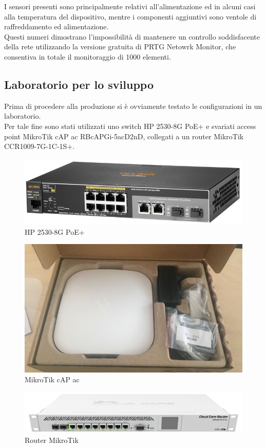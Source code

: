 \documentclass[Realizzazione.tex]{subfiles}
\begin{document}
I sensori presenti sono principalmente relativi all'alimentazione ed in alcuni casi alla temperatura del dispositivo, mentre i componenti aggiuntivi sono ventole di raffreddamento ed alimentazione. \\
Questi numeri dimostrano l'impossibilità di mantenere un controllo soddisfacente della rete utilizzando la versione gratuita di PRTG Netowrk Monitor, che consentiva in totale il monitoraggio di 1000 elementi. \\

\subsection{Laboratorio per lo sviluppo}
Prima di procedere alla produzione si è ovviamente testato le configurazioni in un laboratorio. \\
Per tale fine sono stati utilizzati uno switch HP 2530-8G PoE+ e svariati access point MikroTik cAP ac RBcAPGi-5acD2nD, collegati a un router MikroTik CCR1009-7G-1C-1S+.

\begin{figure}[H]
	\centering
	\includegraphics[width=0.6\linewidth]{"images/HP"}
	\caption{HP 2530-8G PoE+}
	\label{fig:HP 2530-8G PoE+}
\end{figure}
\begin{figure}[H]
	\centering
	\includegraphics[width=0.6\linewidth]{"images/AP"}
	\caption{MikroTik cAP ac}
	\label{fig:MikroTik cAP ac}
\end{figure}
\begin{figure}[H]
	\centering
	\includegraphics[width=0.6\linewidth]{"images/Router"}
	\caption{Router MikroTik}
	\label{fig:Router MikroTik}
\end{figure}
\end{document}
